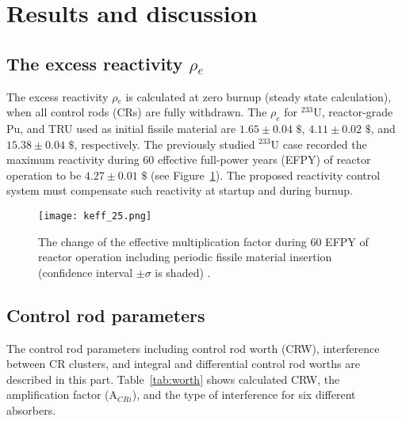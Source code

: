 \section{Results and discussion} \label{Results-and-discussion}

\subsection{The excess reactivity $\rho$$_e$}

The excess reactivity $\rho$$_e$ is calculated at zero burnup (steady state 
calculation), when all control rods (CRs) are fully withdrawn. The $\rho_e$ for $^{233}$U, 
reactor-grade Pu, and TRU used as initial fissile material are $1.65\pm0.04$ 
$\$$, $4.11\pm0.02$ $\$$, and $15.38\pm0.04$ $\$$, respectively.
The previously studied $^{233}$U case recorded the maximum reactivity
during 60 effective full-power years (EFPY) of reactor operation to be 
$4.27\pm0.01$ $\$$ (see Figure~\ref{fig:keff_25}).
The proposed reactivity control system must compensate such reactivity at startup and during burnup.
\begin{figure}
	\centering
	\texttt{[image: keff\_25.png]}
	\vspace{-0.5in}
	\caption{The change of the effective multiplication factor during 60 EFPY of reactor operation including periodic fissile material insertion (confidence interval $\pm\sigma$ is shaded) \cite{ashraf2020whole}.} 
	\label{fig:keff_25}
\end{figure}

\subsection{Control rod parameters}

The control rod parameters including control rod worth (CRW), interference 
between CR clusters, and integral and differential control rod worths are 
described in this part. 
Table~\ref{tab:worth} shows calculated CRW, the amplification 
factor (A$_{CRi}$), and the type of interference for six different 
absorbers.

